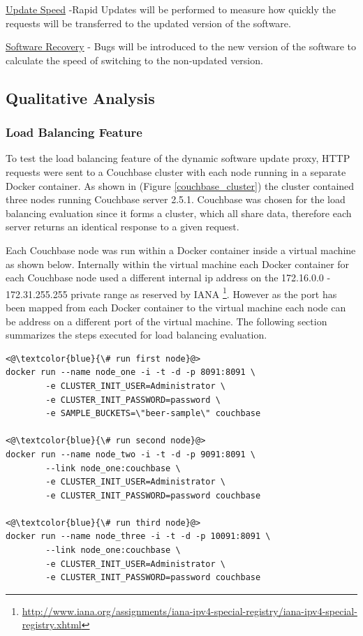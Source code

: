 \documentclass[a4paper,11pt,twoside]{article}
\begin{document}
\noindent
\underline{Update Speed} -Rapid Updates will be performed to measure how quickly the requests will be transferred to the updated version of the software. 

\noindent
\underline{Software Recovery} - Bugs will be introduced to the new version of the software to calculate the speed of switching to the non-updated version. \bigskip

\subsection{Qualitative Analysis}
\subsubsection{Load Balancing Feature}
To test the load balancing feature of the dynamic software update proxy, HTTP requests were sent to a Couchbase cluster with each node running in a separate Docker container.  As shown in (Figure \ref{couchbase_cluster}) the cluster contained three nodes running Couchbase server 2.5.1.  Couchbase was chosen for the load balancing evaluation since it forms a cluster, which all share data, therefore each server returns an identical response to a given request. 

Each Couchbase node was run within a Docker container inside a virtual machine as shown below. Internally within the virtual machine each Docker container for each Couchbase node used a different internal ip address on the 172.16.0.0 - 172.31.255.255 private range as reserved by IANA \footnote{\label{IANA} \url{http://www.iana.org/assignments/iana-ipv4-special-registry/iana-ipv4-special-registry.xhtml}}.  However as the port has been mapped from each Docker container to the virtual machine each node can be address on a different port of the virtual machine. The following section summarizes the steps executed for load balancing evaluation. \bigskip

\begin{lstlisting}[language=terminal]
<@\textcolor{blue}{\# run first node}@>
docker run --name node_one -i -t -d -p 8091:8091 \
		-e CLUSTER_INIT_USER=Administrator \
		-e CLUSTER_INIT_PASSWORD=password \
		-e SAMPLE_BUCKETS=\"beer-sample\" couchbase

<@\textcolor{blue}{\# run second node}@>
docker run --name node_two -i -t -d -p 9091:8091 \
		--link node_one:couchbase \
		-e CLUSTER_INIT_USER=Administrator \
		-e CLUSTER_INIT_PASSWORD=password couchbase

<@\textcolor{blue}{\# run third node}@>
docker run --name node_three -i -t -d -p 10091:8091 \
		--link node_one:couchbase \
		-e CLUSTER_INIT_USER=Administrator \
		-e CLUSTER_INIT_PASSWORD=password couchbase
\end{lstlisting}
\end{document}

